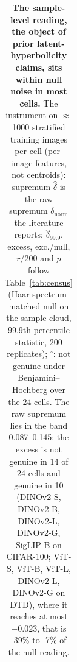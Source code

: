 \begin{table}[H]
\begin{tabular}{lcccccc|cccccc}
\bottomrule
\end{tabular}
\par\vspace{5pt}
\caption{\textbf{The sample-level reading, the object of prior latent-hyperbolicity claims, sits within null noise in most cells.} The instrument on $\approx$1000 stratified training images per cell (per-image features, not centroids): supremum $\hat\delta$ is the raw supremum $\delta_{\text{norm}}$ the literature reports; $\hat\delta_{99.9}$, excess, exc./null, $r$/200 and $p$ follow Table~\ref{tab:census} (Haar spectrum-matched null on the sample cloud, 99.9th-percentile statistic, 200 replicates); $^{\circ}$: not genuine under Benjamini--Hochberg over the 24 cells. The raw supremum lies in the band 0.087--0.145; the excess is not genuine in 14 of 24 cells and genuine in 10 (DINOv2-S, DINOv2-B, DINOv2-L, DINOv2-G, SigLIP-B on CIFAR-100; ViT-S, ViT-B, ViT-L, DINOv2-L, DINOv2-G on DTD), where it reaches at most $-0.023$, that is -39\% to -7\% of the null reading. %
}
\label{tab:q3-sample}
\end{table}
